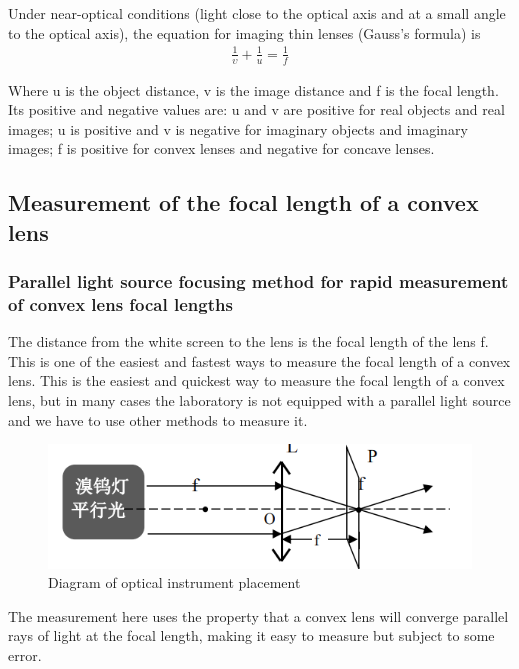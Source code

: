 \documentclass[UTF8]{article}
\begin{document}
    Under near-optical conditions (light close to the optical axis and at a small angle to the optical axis), the equation for imaging thin lenses (Gauss's formula) is
    \begin{eqnarray}
    \frac{1}{\upsilon } +\frac{1}{u}  =  \frac{1}{f}  
    \end{eqnarray}
    
    Where u is the object distance, v is the image distance and f is the focal length. Its positive and negative values are: u and v are positive for real objects and real images; u is positive and v is negative for imaginary objects and imaginary images; f is positive for convex lenses and negative for concave lenses.
   
    
	\subsection{Measurement of the focal length of a convex lens}
	\subsubsection{Parallel light source focusing method for rapid measurement of convex lens focal lengths}
     The distance from the white screen to the lens is the focal length of the lens f. This is one of the easiest and fastest ways to measure the focal length of a convex lens. This is the easiest and quickest way to measure the focal length of a convex lens, but in many cases the laboratory is not equipped with a parallel light source and we have to use other methods to measure it.
     \begin{figure}[H]
     	   					\centering
     	   					\includegraphics[clip,scale=1,trim={0 0 0 0}]{fig/fig5.png}
     	   					\caption{Diagram of optical instrument placement}
     	   					\label{figure.5}
     	   \end{figure}
     The measurement here uses the property that a convex lens will converge parallel rays of light at the focal length, making it easy to measure but subject to some error.
     
\end{document}
